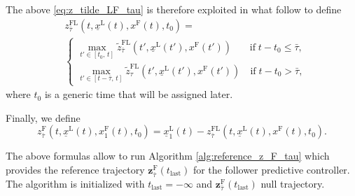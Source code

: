 The above \eqref{eq:z_tilde_LF_tau} is therefore exploited in  what follow to define
\begin{equation}\label{eq:z_LF_tau}
	\begin{aligned}
		& z^{\mathrm{FL}}_{\bar{\tau}} (t,\underline{x}^\mathrm{L}(t),x^\mathrm{F}(t),t_0)= \\
		& \begin{cases}
			\max_{t' \in [t_0,\, t]} \tilde{z}^{\mathrm{FL}}_{\bar{\tau}} (t',\underline{x}^\mathrm{L}(t'),x^\mathrm{F}(t'))\quad \; \; \; \mathrm{if }\; t-t_0\leq \bar{\tau}, \\
			\max_{t' \in [t-\bar{\tau},\, t]} \tilde{z}^{\mathrm{FL}}_\tau (t',\underline{x}^\mathrm{L}(t'),x^\mathrm{F}(t'))\quad \mathrm{if }\; t-t_0> \bar{\tau},
		\end{cases}
	\end{aligned}
\end{equation}
where $t_0$ is a generic time that will be assigned later.  

Finally, we define 
\begin{equation}\label{eq:z_F_tau}
	z_{\bar{\tau}}^\mathrm{F}(t,\underline{x}^\mathrm{L}(t),x_1^\mathrm{F}(t),t_0)=\underline{x}_1^\mathrm{L}(t)-z^{\mathrm{FL}}_{\bar{\tau}} (t,\underline{x}^\mathrm{L}(t),x^\mathrm{F}(t),t_0).
\end{equation}


The above formulas allow to run Algorithm \ref{alg:reference_z_F_tau} which provides the reference trajectory $\mathbf{z}_{\bar{\tau}}^\mathrm{F}(t_{\mathrm{last}})$ for the follower predictive controller. The algorithm is initialized with $t_{\mathrm{last}}=-\infty$ and  $\mathbf{z}_{\bar{\tau}}^\mathrm{F}(t_{\mathrm{last}})$ null trajectory. 



